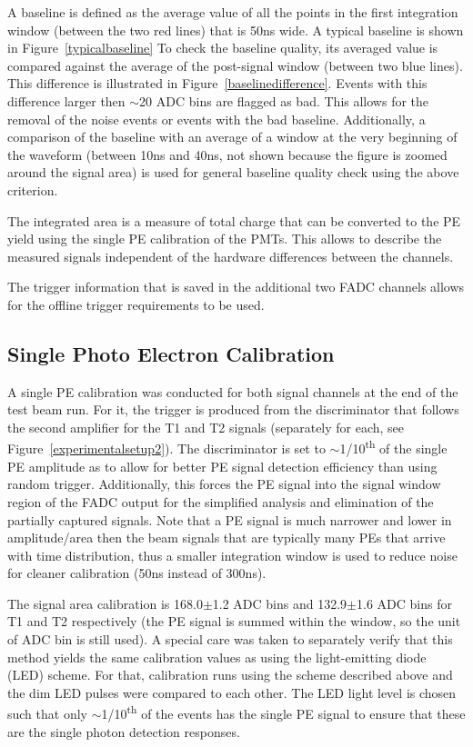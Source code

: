 \documentclass[preprint,12pt]{elsarticle}
\begin{document}
A baseline is defined as the average value of all the points in the first integration window (between the two red lines) that is 50ns wide. A typical baseline is shown in Figure~\ref{typicalbaseline} To check the baseline quality, its averaged value is compared against the average of the post-signal window (between two blue lines). This difference is illustrated in Figure~\ref{baselinedifference}. Events with this difference larger then $\sim$20 ADC bins are flagged as bad. This allows for the removal of the noise events or events with the bad baseline. Additionally, a comparison of the baseline with an average of a window at the very beginning of the waveform (between 10ns and 40ns, not shown because the figure is zoomed around the signal area) is used for general baseline quality check using the above criterion.


The integrated area is a measure of total charge that can be converted to the PE yield using the single PE calibration of the PMTs. This allows to describe the measured signals independent of the hardware differences between the channels.

The trigger information that is saved in the additional two FADC channels allows for the offline trigger requirements to be used.

\subsection{Single Photo Electron Calibration}
\label{singlePEcalibsection}

A single PE calibration was conducted for both signal channels at the end of the test beam run. For it, the trigger is produced from the discriminator that follows the second amplifier for the T1 and T2 signals (separately for each, see Figure~\ref{experimentalsetup2}). The discriminator is set to $\sim$1/10\textsuperscript{th} of the single PE amplitude as to allow for better PE signal detection efficiency than using random trigger. Additionally, this forces the PE signal into the signal window region of the FADC output for the simplified analysis and elimination of the partially captured signals. Note that a PE signal is much narrower and lower in amplitude/area then the beam signals that are typically many PEs that arrive with time distribution, thus a smaller integration window is used to reduce noise for cleaner calibration (50ns instead of 300ns).

The signal area calibration is 168.0$\pm$1.2 ADC bins and 132.9$\pm$1.6 ADC bins for T1 and T2 respectively (the PE signal is summed within the window, so the unit of ADC bin is still used). A special care was taken to separately verify that this method yields the same calibration values as using the light-emitting diode (LED) scheme. For that, calibration runs using the scheme described above and the dim LED pulses were compared to each other. The LED light level is chosen such that only $\sim$1/10\textsuperscript{th} of the events has the single PE signal to ensure that these are the single photon detection responses.
\end{document}
